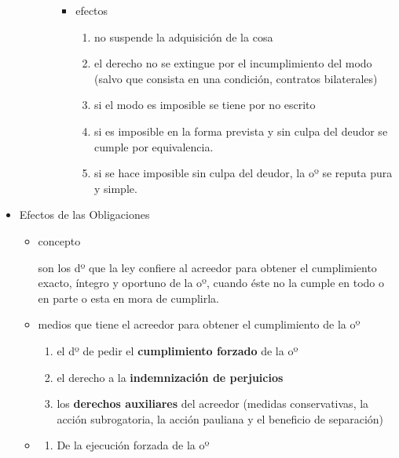\documentclass[]{article}
\providecommand{\tightlist}{%
  \setlength{\itemsep}{0pt}\setlength{\parskip}{0pt}}
\begin{document}
\begin{itemize}
\begin{itemize}
\begin{itemize}
      \begin{itemize}
      \tightlist
      \item
        efectos

        \begin{enumerate}
        \def\labelenumi{\arabic{enumi}.}
        \tightlist
        \item
          no suspende la adquisición de la cosa
        \item
          el derecho no se extingue por el incumplimiento del modo
          (salvo que consista en una condición, contratos bilaterales)
        \item
          si el modo es imposible se tiene por no escrito
        \item
          si es imposible en la forma prevista y sin culpa del deudor se
          cumple por equivalencia.
        \item
          si se hace imposible sin culpa del deudor, la oº se reputa
          pura y simple.
        \end{enumerate}
      \end{itemize}
    \end{itemize}
  \end{itemize}
\item
  Efectos de las Obligaciones

  \begin{itemize}
  \item
    concepto

    son los dº que la ley confiere al acreedor para obtener el
    cumplimiento exacto, íntegro y oportuno de la oº, cuando éste no la
    cumple en todo o en parte o esta en mora de cumplirla.
  \item
    medios que tiene el acreedor para obtener el cumplimiento de la oº

    \begin{enumerate}
    \def\labelenumi{\arabic{enumi}.}
    \tightlist
    \item
      el dº de pedir el \textbf{cumplimiento forzado} de la oº
    \item
      el derecho a la \textbf{indemnización de perjuicios}
    \item
      los \textbf{derechos auxiliares} del acreedor (medidas
      conservativas, la acción subrogatoria, la acción pauliana y el
      beneficio de separación)
    \end{enumerate}
  \item
    \begin{enumerate}
    \def\labelenumi{\arabic{enumi}.}
    \tightlist
    \item
      De la ejecución forzada de la oº


\end{enumerate}
\end{itemize}
\end{itemize}
\end{document}

